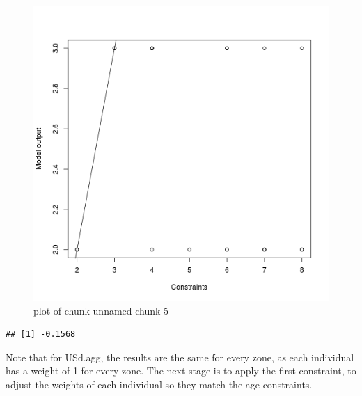 \begin{Shaded}
\begin{Highlighting}[]
\NormalTok{(}\NormalTok{(}\NormalTok{(} \NormalTok{, }
     \NormalTok{)}
\NormalTok{(} \NormalTok{, } \NormalTok{)}
\end{Highlighting}
\end{Shaded}
\begin{figure}[htbp]
\centering
\includegraphics{figure/unnamed-chunk-5.png}
\caption{plot of chunk unnamed-chunk-5}
\end{figure}

\begin{Shaded}
\begin{Highlighting}[]
\NormalTok{(}\NormalTok{(}\NormalTok{(}
\end{Highlighting}
\end{Shaded}
\begin{verbatim}
## [1] -0.1568
\end{verbatim}
Note that for USd.agg, the results are the same for every zone, as each
individual has a weight of 1 for every zone. The next stage is to apply
the first constraint, to adjust the weights of each individual so they
match the age constraints.

